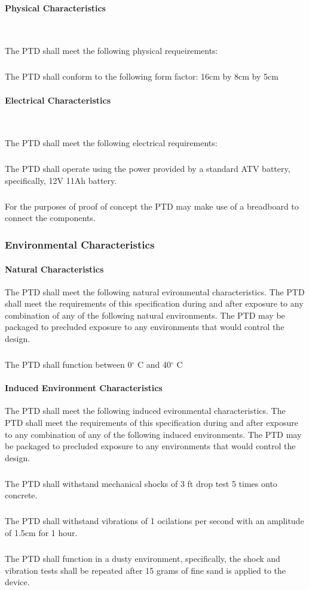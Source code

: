 \documentclass[11pt]{article}
\begin{document}
\paragraph{Physical Characteristics} ~ \par 
The PTD shall meet the following physical requeirements:
    \subparagraph{} \hangindent=4cm The PTD shall conform to the following form factor: 16cm by 8cm by 5cm 

\paragraph{Electrical Characteristics} ~ \par 
The PTD shall meet the following electrical requirements:
    \subparagraph{} \hangindent=4cm The PTD shall operate using the power provided by a standard ATV battery, specifically, 12V 11Ah battery.
    \subparagraph{} \hangindent=4cm For the purposes of proof of concept the PTD may make use of a breadboard to connect the components.

\subsubsection{Environmental Characteristics}

\paragraph{Natural Characteristics}
The PTD shall meet the following natural evironmental characteristics. The PTD shall meet the requirements of this specification during and 
after exposure to any combination of any of the following natural environments. The PTD may be packaged to precluded exposure to any 
environments that would control the design.
    \subparagraph{} \hangindent=4cm The PTD shall function between 0$^{\circ}$ C and 40$^{\circ}$ C

\paragraph{Induced Environment Characteristics}
The PTD shall meet the following induced evironmental characteristics. The PTD shall meet the requirements of this specification during 
and after exposure to any combination of any of the following induced environments. The PTD may be packaged to precluded exposure to any 
environments that would control the design.
    \subparagraph{} \hangindent=4cm The PTD shall withstand mechanical shocks of 3 ft drop test 5 times onto concrete.
    \subparagraph{} \hangindent=4cm The PTD shall withstand vibrations of 1 ocilations per second with an amplitude of 1.5cm for 1 hour.
    \subparagraph{} \hangindent=4cm The PTD shall function in a dusty environment, specifically, the shock and vibration tests shall be repeated 
after 15 grams of fine sand is applied to the device. 
\end{document}
